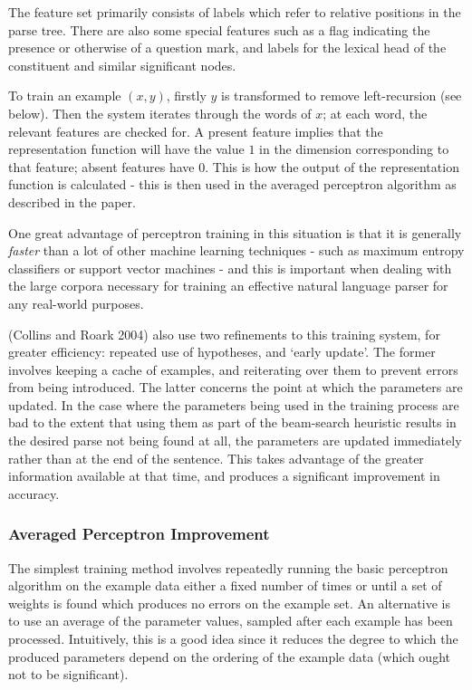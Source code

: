 \documentclass[11pt]{article}
\begin{document}
The feature set primarily consists of labels which refer to relative positions
in the parse tree. There are also some special features such as a flag
indicating the presence or otherwise of a question mark, and labels for the
lexical head of the constituent and similar significant nodes.

To train an example $(x, y)$, firstly $y$ is transformed to remove
left-recursion (see below). Then the system iterates through the words of $x$;
at each word, the relevant features are checked for. A present feature implies
that the representation function will have the value $1$ in the dimension
corresponding to that feature; absent features have $0$. This is how the output
of the representation function is calculated - this is then used in the
averaged perceptron algorithm as described in the paper.

One great advantage of perceptron training in this situation is that it is
generally \emph{faster} than a lot of other machine learning techniques - such
as maximum entropy classifiers or support vector machines - and this is
important when dealing with the large corpora necessary for training an
effective natural language parser for any real-world purposes.

(Collins and Roark 2004)\cite{Collins2004} also use two refinements to this
training system, for greater efficiency: repeated use of hypotheses, and `early
update'. The former involves keeping a cache of examples, and reiterating over
them to prevent errors from being introduced. The latter concerns the point at
which the parameters are updated. In the case where the parameters being used
in the training process are bad to the extent that using them as part of the
beam-search heuristic results in the desired parse not being found at all, the
parameters are updated immediately rather than at the end of the sentence. This
takes advantage of the greater information available at that time, and produces
a significant improvement in accuracy.


\subsubsection*{Averaged Perceptron Improvement}

The simplest training method involves repeatedly running the basic perceptron
algorithm on the example data either a fixed number of times or until a set of
weights is found which produces no errors on the example set. An alternative is
to use an average of the parameter values, sampled after each example has been
processed. Intuitively, this is a good idea since it reduces the degree to
which the produced parameters depend on the ordering of the example data (which
ought not to be significant).
\end{document}
